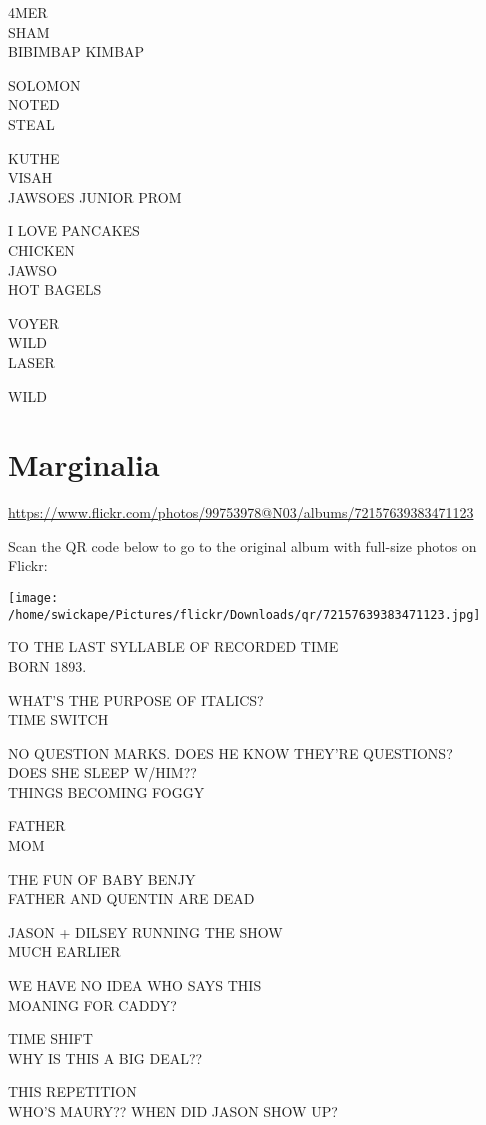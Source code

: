 \documentclass[10pt,letterpaper]{article}
\begin{document}
4MER\\
SHAM\\
BIBIMBAP KIMBAP

SOLOMON\\
NOTED\\
STEAL

KUTHE\\
VISAH\\
JAWSOES JUNIOR PROM

I LOVE PANCAKES\\
CHICKEN\\
JAWSO\\
HOT BAGELS

VOYER\\
WILD\\
LASER

WILD
\pagebreak

\section*{Marginalia}

\url{https://www.flickr.com/photos/99753978@N03/albums/72157639383471123}

Scan the QR code below to go to the original album with full-size photos on Flickr:

\texttt{[image: /home/swickape/Pictures/flickr/Downloads/qr/72157639383471123.jpg]}
\pagebreak

TO THE LAST SYLLABLE OF RECORDED TIME\\
BORN 1893.

WHAT'S THE PURPOSE OF ITALICS?\\
TIME SWITCH

NO QUESTION MARKS.  DOES HE KNOW THEY'RE QUESTIONS?\\
DOES SHE SLEEP W/HIM??\\
THINGS BECOMING FOGGY

FATHER\\
MOM

THE FUN OF BABY BENJY\\
FATHER AND QUENTIN ARE DEAD

JASON + DILSEY RUNNING THE SHOW\\
MUCH EARLIER

WE HAVE NO IDEA WHO SAYS THIS\\
MOANING FOR CADDY?

TIME SHIFT\\
WHY IS THIS A BIG DEAL??

THIS REPETITION\\
WHO'S MAURY?? WHEN DID JASON SHOW UP?
\end{document}
